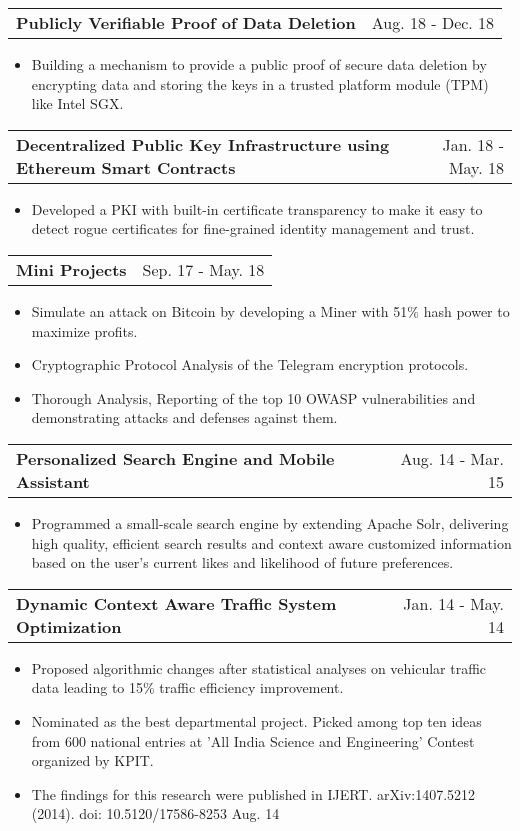 \documentclass[a4paper,10pt]{article}
\makeatletter
\newcommand{\projectHeading}[2]{
    \begin{tabular*}{1\textwidth}{l@{\extracolsep{\fill}}r}
      \large{\textbf{#1}} & \small{#2} 
    \end{tabular*}
}
\newcommand{\resumeItemListStart}{\begin{itemize}[topsep=2pt, parsep=2pt, listparindent=0pt, itemindent=0pt, itemsep=1pt, leftmargin=*]}
\newcommand{\resumeItemListEnd}{\end{itemize}}
\makeatother
\begin{document}
    \projectHeading{Publicly Verifiable Proof of Data Deletion}{Aug. 18 - Dec. 18}
    \resumeItemListStart
    \item\small{Building a mechanism to provide a public proof of secure data deletion by encrypting data and storing the keys in a trusted platform module (TPM) like Intel SGX.}
    \resumeItemListEnd
    \projectHeading{Decentralized Public Key Infrastructure using Ethereum Smart Contracts}{Jan. 18 - May. 18} 
    \resumeItemListStart
     \item\small{Developed a PKI with built-in certificate transparency to make it easy to detect rogue certificates for fine-grained identity management and trust.}
    \resumeItemListEnd
    
    \projectHeading{Mini Projects}{Sep. 17 - May. 18} 
    \resumeItemListStart
    	 \item\small{Simulate an attack on Bitcoin by developing a Miner with 51\% hash power to maximize profits.}
    	 \item\small{Cryptographic Protocol Analysis of the Telegram encryption protocols.}
    	 \item\small{Thorough Analysis, Reporting of the top 10 OWASP vulnerabilities and demonstrating attacks and defenses against them.}
    \resumeItemListEnd
    
   \projectHeading{Personalized Search Engine and Mobile Assistant}{Aug. 14 - Mar. 15} 
    \resumeItemListStart
       \item\small{Programmed a small-scale search engine by extending Apache Solr, delivering high quality, efficient search results and context aware customized information based on the user's current likes and likelihood of future preferences.}
     \resumeItemListEnd
   
   \projectHeading{Dynamic Context Aware Traffic System Optimization}{Jan. 14 - May. 14} 
    \resumeItemListStart
       \item\small{Proposed algorithmic changes after statistical analyses on vehicular traffic data leading to 15\% traffic efficiency improvement.}
       \item\small{Nominated as the best departmental project. Picked among top ten ideas from 600 national entries at 'All India Science and Engineering' Contest organized by KPIT.}
       \item\small{The findings for this research were published in IJERT. arXiv:1407.5212 (2014). doi: 10.5120/17586-8253 Aug. 14}
     \resumeItemListEnd
\end{document}
